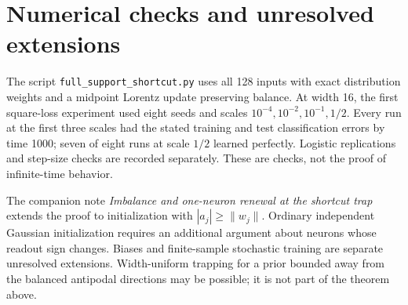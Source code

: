 \documentclass[11pt]{article}
\begin{document}
\section{Numerical checks and unresolved extensions}
The script \texttt{full\_support\_shortcut.py} uses all 128 inputs with
exact distribution weights and a midpoint Lorentz update preserving
balance. At width 16, the first square-loss experiment used eight seeds
and scales $10^{-4},10^{-2},10^{-1},1/2$. Every run at the first three
scales had the stated training and test classification errors by time
1000; seven of eight runs at scale $1/2$ learned perfectly. Logistic
replications and step-size checks are recorded separately. These are
checks, not the proof of infinite-time behavior.

The companion note \emph{Imbalance and one-neuron renewal at the shortcut
trap} extends the proof to initialization with $|a_j|\ge\|w_j\|$.
Ordinary independent
Gaussian initialization requires an additional argument about neurons
whose readout sign changes. Biases and finite-sample stochastic training
are separate unresolved extensions. Width-uniform trapping for a prior
bounded away from the balanced antipodal directions may be possible;
it is not part of the theorem above.
\end{document}
